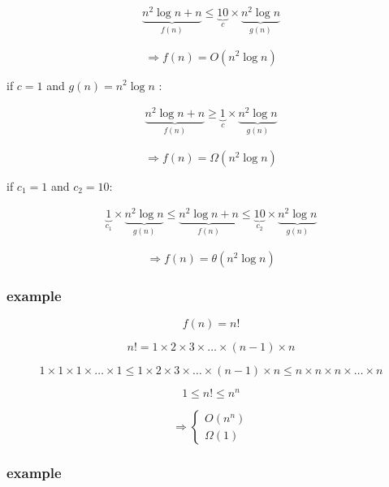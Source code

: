\documentclass[12pt]{article}
\begin{document}
\begin{align*}
\underbrace{n^{2}\log{n} + n}_{f(n)} \leq \underbrace{10}_{c} \times \underbrace{n^{2}\log{n}}_{g(n)} 
\end{align*}

$$
\Rightarrow f(n) = O(n^{2}\log{n})
$$



if $c = 1$ and $g(n) = n^{2}\log{n}$ :

\begin{align*}
\underbrace{n^{2}\log{n} + n}_{f(n)} \geq \underbrace{1}_{c} \times \underbrace{n^{2}\log{n}}_{g(n)} 
\end{align*}

$$
\Rightarrow f(n) = \Omega(n^{2}\log{n})
$$


if $c_{1} = 1$ and  $c_{2} = 10$:

\begin{align*}
\underbrace{1}_{c_{1}} \times \underbrace{n^{2}\log{n}}_{g(n)}  \leq  \underbrace{n^{2}\log{n} + n}_{f(n)} \leq \underbrace{10}_{c_{2}} \times \underbrace{n^{2}\log{n}}_{g(n)} 
\end{align*}

$$
\Rightarrow f(n) = \theta(n^{2}\log{n})
$$





\subsubsection{example}


$$
f(n) = n!
$$

$$
n! = 1 \times 2 \times 3 \times \dots \times (n-1) \times n
$$


$$
1 \times 1 \times 1 \times \dots \times 1 
\leq 
1 \times 2 \times 3 \times \dots \times (n-1) \times n 
\leq
n \times n \times n \times \dots \times n 
$$


$$
1 \leq n! \leq n^{n}
$$



$$
\Rightarrow \begin{cases}
O(n^{n}) 
\\
\Omega(1)
\end{cases}
$$





\subsubsection{example}
\end{document}
